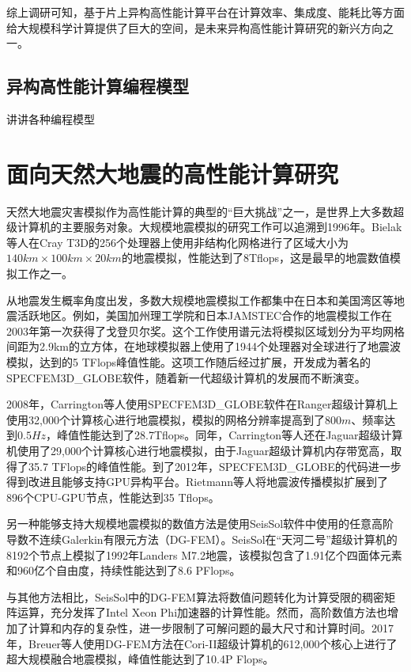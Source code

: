 \documentclass[degree=doctor]{thuthesis}
\begin{document}
综上调研可知，基于片上异构高性能计算平台在计算效率、集成度、能耗比等方面给大规模科学计算提供了巨大的空间，是未来异构高性能计算研究的新兴方向之一。

\subsection{异构高性能计算编程模型}
讲讲各种编程模型

\section{面向天然大地震的高性能计算研究}

天然大地震灾害模拟作为高性能计算的典型的“巨大挑战”之一，是世界上大多数超级计算机的主要服务对象。大规模地震模拟的研究工作可以追溯到1996年。Bielak等人在Cray T3D的256个处理器上使用非结构化网格进行了区域大小为$140km \times 100km \times 20km$的地震模拟\citep{bao1996earthquake}，性能达到了8Tflops，这是最早的地震数值模拟工作之一。

从地震发生概率角度出发，多数大规模地震模拟工作都集中在日本和美国湾区等地震活跃地区。例如，美国加州理工学院和日本JAMSTEC合作的地震模拟工作在2003年第一次获得了戈登贝尔奖\citep{es-gb-2003}。这个工作使用谱元法\cite{chen2006glueball}将模拟区域划分为平均网格间距为2.9km的立方体，在地球模拟器上使用了1944个处理器对全球进行了地震波模拟，达到的5 TFlops峰值性能。这项工作随后经过扩展，开发成为著名的SPECFEM3D\_GLOBE软件\cite{bozdag2010specfem3d_globe}，随着新一代超级计算机的发展而不断演变。

2008年，Carrington等人使用SPECFEM3D\_GLOBE软件在Ranger超级计算机上使用32,000个计算核心进行地震模拟\cite{carrington2008high}，模拟的网格分辨率提高到了$800m$、频率达到$0.5Hz$，峰值性能达到了28.7Tflops。同年，Carrington等人还在Jaguar超级计算机使用了29,000个计算核心进行地震模拟，由于Jaguar超级计算机内存带宽高，取得了35.7 TFlops的峰值性能。到了2012年，SPECFEM3D\_GLOBE的代码进一步得到改进且能够支持GPU异构平台。Rietmann等人将地震波传播模拟扩展到了896个CPU-GPU节点\citep{rietmann2012forward}，性能达到35 Tflops。

另一种能够支持大规模地震模拟的数值方法是使用SeisSol软件中使用的任意高阶导数不连续Galerkin有限元方法\cite{godel2010scalability}（DG-FEM）。SeisSol在“天河二号”超级计算机的8192个节点上模拟了1992年Landers M7.2地震\citep{tianhe2-2014gb}，该模拟包含了1.91亿个四面体元素和960亿个自由度，持续性能达到了8.6 PFlops。

与其他方法相比，SeisSol中的DG-FEM算法将数值问题转化为计算受限的稠密矩阵运算，充分发挥了Intel Xeon Phi加速器的计算性能。然而，高阶数值方法也增加了计算和内存的复杂性，进一步限制了可解问题的最大尺寸和计算时间。2017年，Breuer等人使用DG-FEM方法在Cori-II超级计算机的612,000个核心上进行了超大规模融合地震模拟\citep{breuer2017edge}，峰值性能达到了10.4P Flops。
\end{document}
